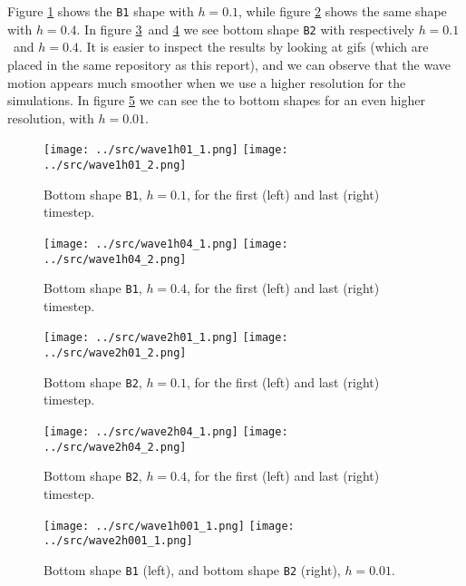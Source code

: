 \documentclass[10pt, a4paper]{amsart}
\numberwithin{figure}{section}
\numberwithin{table}{section}
\begin{document}
Figure \ref{fig:wave1h01} shows the \texttt{B1} shape with $h=0.1$, while
figure \ref{fig:wave1h04} shows the same shape with $h=0.4$. In figure
\ref{fig:wave2h01} and \ref{fig:wave2h04} we see bottom shape \texttt{B2} with
respectively $h=0.1$ and $h=0.4$. It is easier to inspect the results by
looking at gifs (which are placed in the same repository as this report), and
we can observe that the wave motion appears much smoother when we use a higher
resolution for the simulations. In figure \ref{fig:wave1h001} we can see the to
bottom shapes for an even higher resolution, with $h=0.01$.

\begin{figure}
       \texttt{[image: ../src/wave1h01\_1.png]}
       \texttt{[image: ../src/wave1h01\_2.png]}
       \caption{Bottom shape \texttt{B1}, $h=0.1$, for the first (left) 
       and last (right) timestep.}
       \label{fig:wave1h01}
\end{figure}

\begin{figure}
       \texttt{[image: ../src/wave1h04\_1.png]}
       \texttt{[image: ../src/wave1h04\_2.png]}
       \caption{Bottom shape \texttt{B1}, $h=0.4$, for the first (left) 
       and last (right) timestep.}
       \label{fig:wave1h04}
\end{figure}

\begin{figure}
       \texttt{[image: ../src/wave2h01\_1.png]}
       \texttt{[image: ../src/wave2h01\_2.png]}
       \caption{Bottom shape \texttt{B2}, $h=0.1$, for the first (left) 
       and last (right) timestep.}
       \label{fig:wave2h01}
\end{figure}

\begin{figure}
       \texttt{[image: ../src/wave2h04\_1.png]}
       \texttt{[image: ../src/wave2h04\_2.png]}
       \caption{Bottom shape \texttt{B2}, $h=0.4$, for the first (left) 
       and last (right) timestep.}
       \label{fig:wave2h04}
\end{figure}
\begin{figure}
       \texttt{[image: ../src/wave1h001\_1.png]}
       \texttt{[image: ../src/wave2h001\_1.png]}
       \caption{Bottom shape \texttt{B1} (left), and bottom shape \texttt{B2}
       (right), $h=0.01$.}
       \label{fig:wave1h001}
\end{figure}
\end{document}
